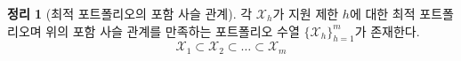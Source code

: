 \documentclass[11pt]{article} %
\newif\ifen
\newtheorem{theorem}{Theorem}
\newtheorem{lemma}{Lemma}
\theoremstyle{definition}
\newtheorem{theorem}{정리}
\newtheorem{lemma}{기본정리}
\theoremstyle{definition}
\begin{document}
%

\begin{theorem}[\ifen Nestedness of optimal application portfolios\else 최적 포트폴리오의 포함 사슬 관계\fi] \label{nestedapplication}
\ifen There exists a sequence of portfolios $\{\mathcal{X}_h\}_{h=1}^m$ satisfying the nestedness relation
\else  각 $\mathcal{X}_h$가 지원 제한 $h$에 대한 최적 포트폴리오며 위의 포함 사슬 관계를 만족하는 포트폴리오 수열  $\{\mathcal{X}_h\}_{h=1}^m$가 존재한다.\fi
\begin{equation}
\mathcal{X}_1 \subset \mathcal{X}_2\subset \dots \subset \mathcal{X}_m
\end{equation}
\ifen such that each $\mathcal{X}_h$ is an optimal application portfolio when the application limit is $h$.\fi
\end{theorem}
\end{document}
